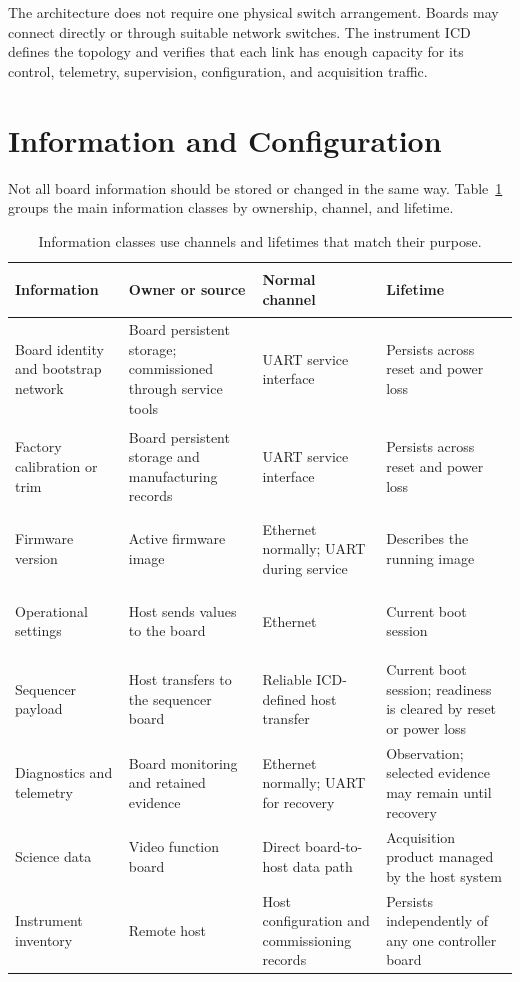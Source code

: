 The architecture does not require one physical switch arrangement. Boards may connect directly or through suitable network switches. The instrument ICD defines the topology and verifies that each link has enough capacity for its control, telemetry, supervision, configuration, and acquisition traffic.

\section{Information and Configuration}

Not all board information should be stored or changed in the same way. Table~\ref{tab:information-lifetime} groups the main information classes by ownership, channel, and lifetime.

\begin{table}[htbp]
\centering
\small
\begin{tabularx}{\textwidth}{@{}>{\bfseries\raggedright\arraybackslash}p{}>{\raggedright\arraybackslash}p{}>{\raggedright\arraybackslash}p{}>{\raggedright\arraybackslash}X@{}}
\toprule
Information & Owner or source & Normal channel & Lifetime \\
\midrule
Board identity and bootstrap network & Board persistent storage; commissioned through service tools & UART service interface & Persists across reset and power loss \\
Factory calibration or trim & Board persistent storage and manufacturing records & UART service interface & Persists across reset and power loss \\
Firmware version & Active firmware image & Ethernet normally; UART during service & Describes the running image \\
Operational settings & Host sends values to the board & Ethernet & Current boot session \\
Sequencer payload & Host transfers to the sequencer board & Reliable ICD-defined host transfer & Current boot session; readiness is cleared by reset or power loss \\
Diagnostics and telemetry & Board monitoring and retained evidence & Ethernet normally; UART for recovery & Observation; selected evidence may remain until recovery \\
Science data & Video function board & Direct board-to-host data path & Acquisition product managed by the host system \\
Instrument inventory & Remote host & Host configuration and commissioning records & Persists independently of any one controller board \\
\bottomrule
\end{tabularx}
\caption{Information classes use channels and lifetimes that match their purpose.}
\label{tab:information-lifetime}
\end{table}

